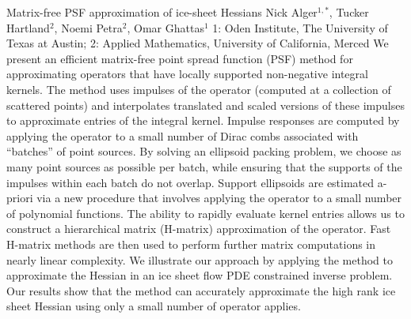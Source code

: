 \begin{addmargin}[2em]{0em}
\vspace{1.5ex}
\abs
{Matrix-free PSF approximation of ice-sheet Hessians}
{Nick Alger$^{1,*}$, Tucker Hartland$^{2}$, Noemi Petra$^{2}$, Omar Ghattas$^{1}$}
{1: Oden Institute, The University of Texas at Austin; 2: Applied Mathematics, University of California, Merced}
{We present an efficient matrix-free point spread function (PSF) method for approximating operators that have locally supported non-negative integral kernels. The method uses impulses of the operator (computed at a collection of scattered points) and interpolates translated and scaled versions of these impulses to approximate entries of the integral kernel. Impulse responses are computed by applying the operator to a small number of Dirac combs associated with ``batches'' of point sources. By solving an ellipsoid packing problem, we choose as many point sources as possible per batch, while ensuring that the supports of the impulses within each batch do not overlap. Support ellipsoids are estimated a-priori via a new procedure that involves applying the operator to a small number of polynomial functions. The ability to rapidly evaluate kernel entries allows us to construct a hierarchical matrix (H-matrix) approximation of the operator. Fast H-matrix methods are then used to perform further matrix computations in nearly linear complexity. We illustrate our approach by applying the method to approximate the Hessian in an ice sheet flow PDE constrained inverse problem. Our results show that the method can accurately approximate the high rank ice sheet Hessian using only a small number of operator applies.}

\end{addmargin}
